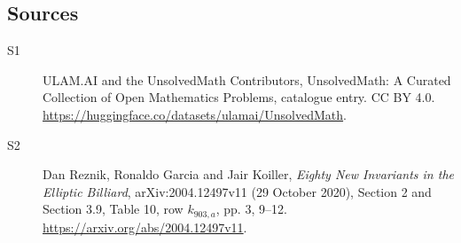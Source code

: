 \documentclass[11pt]{article}
\begin{document}
\subsection{Sources}
\begin{description}
\item[\hypertarget{source:statement:1}{S1}] ULAM.AI and the UnsolvedMath Contributors, UnsolvedMath: A Curated Collection of Open Mathematics Problems, catalogue entry. CC BY 4.0. \url{https://huggingface.co/datasets/ulamai/UnsolvedMath}.
\item[\hypertarget{source:statement:2}{S2}] Dan Reznik, Ronaldo Garcia and Jair Koiller, \emph{Eighty New Invariants in the Elliptic Billiard}, arXiv:2004.12497v11 (29 October 2020), Section 2 and Section 3.9, Table 10, row $k_{903,a}$, pp. 3, 9--12. \url{https://arxiv.org/abs/2004.12497v11}.
\end{description}
\label{end:statement}
\end{document}

